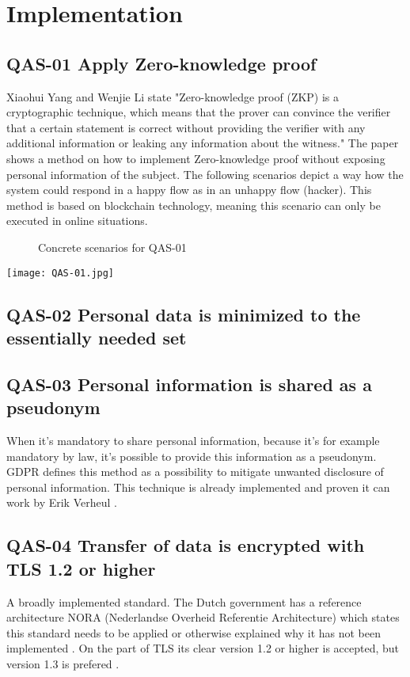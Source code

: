 \chapter{Implementation}\label{s:implementation}

\section{QAS-01 Apply Zero-knowledge proof}
Xiaohui Yang and Wenjie Li\cite{YANG2020102050} state "Zero-knowledge proof (ZKP) is a cryptographic technique,
which means that the prover can convince the verifier that a certain statement is correct without providing the verifier with any additional information or leaking any information about the witness."
The paper shows a method on how to implement Zero-knowledge proof without exposing personal information of the subject. The following scenarios depict a way how the system could respond in a happy flow as in an unhappy flow (hacker).
This method is based on blockchain technology, meaning this scenario can only be executed in online situations.

\graphicspath{ {./images/} }
\begin{figure}[t]
\centering
\caption{Concrete scenarios for QAS-01}
\label{fig:QAS-01}
\end{figure}
\texttt{[image: QAS-01.jpg]}\\

\section{QAS-02 Personal data is minimized to the essentially needed set}

\section{QAS-03 Personal information is shared as a pseudonym}
When it's mandatory to share personal information, because it's for example mandatory by law, it's possible to provide this information as a pseudonym. GDPR \cite{GDPR} defines this method as a possibility to mitigate unwanted disclosure of personal information. 
This technique is already implemented and proven it can work by Erik Verheul \cite{VerheuleID}. 

\section{QAS-04 Transfer of data is encrypted with TLS 1.2 or higher}
A broadly implemented standard. The Dutch government has a reference architecture NORA (Nederlandse Overheid Referentie Architecture) \cite{NORA} which states this standard needs to be applied or otherwise explained why it has not been implemented \cite{NORA_PasToeOfLegUit}. On the part of TLS its clear version 1.2 or higher is accepted, but version 1.3 is prefered \cite{NORA_TLS}. 

